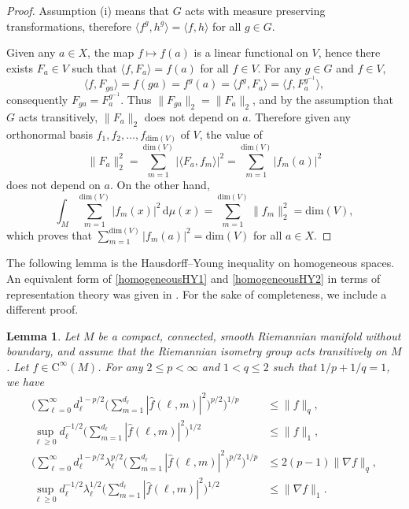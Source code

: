 \documentclass[11pt,a4paper]{article}
\newtheorem{lem}[thm]{Lemma}
\theoremstyle{definition}
\begin{document}
\begin{proof} Assumption (i) means that $G$ acts with measure preserving transformations, therefore $\langle f^g, h^g \rangle = \langle f,h \rangle$ for all $g \in G$.

Given any $a \in X$, the map $f \mapsto f(a)$ is a linear functional on $V$, hence there exists $F_a \in V$ such that $\langle f,F_a \rangle=f(a)$ for all $f \in V$. For any $g \in G$ and $f \in V$,
\[ \langle f, F_{ga} \rangle = f(ga) = f^g(a)=\langle f^g, F_a \rangle = \langle f,F_a^{g^{-1}} \rangle , \]
consequently $F_{ga}=F_a^{g^{-1}}$. Thus $\| F_{ga} \|_2=\| F_a \|_2$, and by the assumption that $G$ acts transitively, $\| F_a \|_2$ does not depend on $a$. Therefore given any orthonormal basis $f_1, f_2, \ldots, f_{\mathrm{dim}(V)}$ of $V$, the value of
\[ \| F_a \|_2^2 = \sum_{m=1}^{\mathrm{dim}(V)} |\langle F_a, f_m \rangle|^2 = \sum_{m=1}^{\mathrm{dim}(V)} |f_m (a)|^2 \]
does not depend on $a$. On the other hand,
\[ \int_M \sum_{m=1}^{\mathrm{dim}(V)} |f_m (x)|^2 \, \mathrm{d}\mu(x)= \sum_{m=1}^{\mathrm{dim}(V)} \| f_m \|_2^2 = \mathrm{dim}(V), \]
which proves that $\sum_{m=1}^{\mathrm{dim}(V)} |f_m(a)|^2=\mathrm{dim}(V)$ for all $a \in X$.
\end{proof}

The following lemma is the Hausdorff--Young inequality on homogeneous spaces. An equivalent form of \eqref{homogeneousHY1} and \eqref{homogeneousHY2} in terms of representation theory was given in \cite{NRT}. For the sake of completeness, we include a different proof.
\begin{lem}\label{homogeneoushausdorffyounglemma} Let $M$ be a compact, connected, smooth Riemannian manifold without boundary, and assume that the Riemannian isometry group acts transitively on $M$. Let $f \in \mathrm{C}^{\infty}(M)$. For any $2 \le p < \infty$ and $1<q \le 2$ such that $1/p+1/q=1$, we have
\begin{align}
\Bigg( \sum_{\ell=0}^{\infty} d_{\ell}^{1-p/2} \Bigg( \sum_{m=1}^{d_{\ell}} |\widehat{f}(\ell,m)|^2 \Bigg)^{p/2} \Bigg)^{1/p} &\le \| f \|_q , \label{homogeneousHY1} \\ \sup_{\ell \ge 0} d_{\ell}^{-1/2} \Bigg( \sum_{m=1}^{d_{\ell}} |\widehat{f}(\ell,m)|^2 \Bigg)^{1/2} &\le \| f \|_1 , \label{homogeneousHY2} \\ \Bigg( \sum_{\ell=0}^{\infty} d_{\ell}^{1-p/2} \lambda_{\ell}^{p/2} \Bigg( \sum_{m=1}^{d_{\ell}} |\widehat{f}(\ell,m)|^2 \Bigg)^{p/2} \Bigg)^{1/p} &\le 2(p-1) \| \nabla f \|_q , \label{homogeneousHY3} \\ \sup_{\ell \ge 0} d_{\ell}^{-1/2} \lambda_{\ell}^{1/2} \Bigg( \sum_{m=1}^{d_{\ell}} |\widehat{f}(\ell,m)|^2 \Bigg)^{1/2} &\le \| \nabla f \|_1 . \label{homogeneousHY4}
\end{align}
\end{lem}
\end{document}
